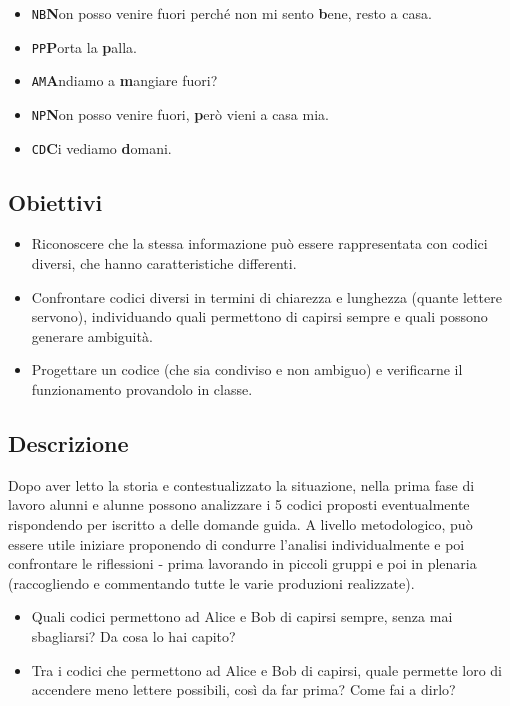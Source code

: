 \begin{description}
\begin{itemize}
\item \texttt{NB}\quad \textcolor{ocre}{\textbf{N}}on posso venire fuori perché non mi sento \textcolor{ocre}{\textbf{b}}ene, resto a casa.
\item \texttt{PP}\quad \textcolor{ocre}{\textbf{P}}orta la \textcolor{ocre}{\textbf{p}}alla.
\item \texttt{AM}\quad \textcolor{ocre}{\textbf{A}}ndiamo a \textcolor{ocre}{\textbf{m}}angiare fuori?
\item \texttt{NP}\quad \textcolor{ocre}{\textbf{N}}on posso venire fuori, \textcolor{ocre}{\textbf{p}}erò vieni a casa mia.
\item \texttt{CD}\quad \textcolor{ocre}{\textbf{C}}i vediamo \textcolor{ocre}{\textbf{d}}omani.
\end{itemize}
\end{description}


\subsection{Obiettivi}\label{obiettivi-1}

\begin{itemize}
\item
  Riconoscere che la stessa informazione può essere rappresentata con codici diversi, che hanno caratteristiche differenti.
\item
  Confrontare codici diversi in termini di chiarezza e lunghezza (quante lettere servono), individuando quali permettono di capirsi sempre e quali possono generare ambiguità.
\item
  Progettare un codice (che sia condiviso e non ambiguo) e verificarne il funzionamento provandolo in classe.
\end{itemize}

\subsection{Descrizione}

Dopo aver letto la storia e contestualizzato la situazione, nella prima fase di lavoro alunni e alunne possono analizzare i 5 codici proposti eventualmente rispondendo per iscritto a delle domande guida. A livello metodologico, può essere utile iniziare proponendo di condurre l'analisi individualmente e poi confrontare le riflessioni - prima lavorando in piccoli gruppi e poi in plenaria (raccogliendo e commentando tutte le varie produzioni realizzate).

\begin{domandestimolo}\label{domande-stimolo-luci-di-natale}

\begin{itemize}
\item
  Quali codici permettono ad Alice e Bob di capirsi sempre, senza mai sbagliarsi? Da cosa lo hai capito?
\item
  Tra i codici che permettono ad Alice e Bob di capirsi, quale permette loro di accendere meno lettere possibili, così da far prima? Come fai a dirlo?
\end{itemize}
\end{domandestimolo}

